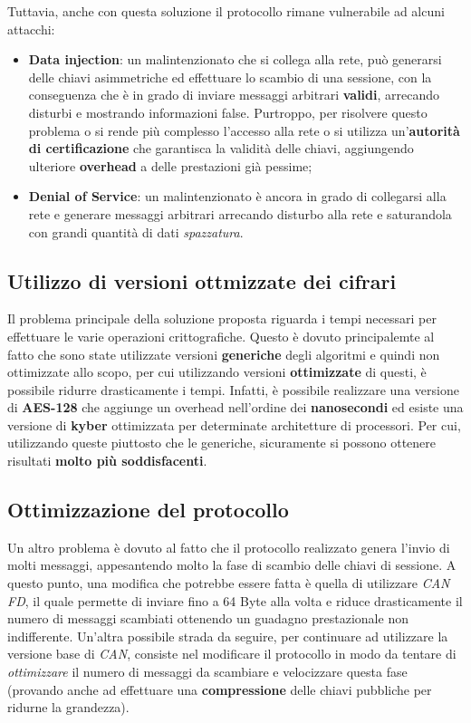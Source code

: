 Tuttavia, anche con questa soluzione il protocollo rimane vulnerabile ad alcuni attacchi:
\begin{itemize}
	\item \textbf{Data injection}: un malintenzionato che si collega alla rete, può generarsi delle chiavi asimmetriche ed effettuare lo scambio di una sessione, con la conseguenza che è in grado di inviare messaggi arbitrari \textbf{validi}, arrecando disturbi e mostrando informazioni false. Purtroppo, per risolvere questo problema o si rende più complesso l'accesso alla rete o si utilizza un'\textbf{autorità di certificazione} che garantisca la validità delle chiavi, aggiungendo ulteriore \textbf{overhead} a delle prestazioni già pessime;
	\item \textbf{Denial of Service}: un malintenzionato è ancora in grado di collegarsi alla rete e generare messaggi arbitrari arrecando disturbo alla rete e saturandola con grandi quantità di dati \emph{spazzatura}.
\end{itemize}

\subsection{Utilizzo di versioni ottmizzate dei cifrari}
Il problema principale della soluzione proposta riguarda i tempi necessari per effettuare le varie operazioni crittografiche. Questo è dovuto principalemte al fatto che sono state utilizzate versioni \textbf{generiche} degli algoritmi e quindi non ottimizzate allo scopo, per cui utilizzando versioni \textbf{ottimizzate} di questi, è possibile ridurre drasticamente i tempi. Infatti, è possibile realizzare una versione di \textbf{AES-128} che aggiunge un overhead nell'ordine dei \textbf{nanosecondi} \cite{bozdal_samie_jennions_2018} ed esiste una versione di \textbf{kyber} ottimizzata per determinate architetture di processori. Per cui, utilizzando queste piuttosto che le generiche, sicuramente si possono ottenere risultati \textbf{molto più soddisfacenti}.

\subsection{Ottimizzazione del protocollo}
Un altro problema è dovuto al fatto che il protocollo realizzato genera l'invio di molti messaggi, appesantendo molto la fase di scambio delle chiavi di sessione. A questo punto, una modifica che potrebbe essere fatta è quella di utilizzare \emph{CAN FD}, il quale permette di inviare fino a 64 Byte alla volta e riduce drasticamente il numero di messaggi scambiati ottenendo un guadagno prestazionale non indifferente. Un'altra possibile strada da seguire, per continuare ad utilizzare la versione base di \emph{CAN}, consiste nel modificare il protocollo in modo da tentare di \emph{ottimizzare} il numero di messaggi da scambiare e velocizzare questa fase (provando anche ad effettuare una \textbf{compressione} delle chiavi pubbliche per ridurne la grandezza).

